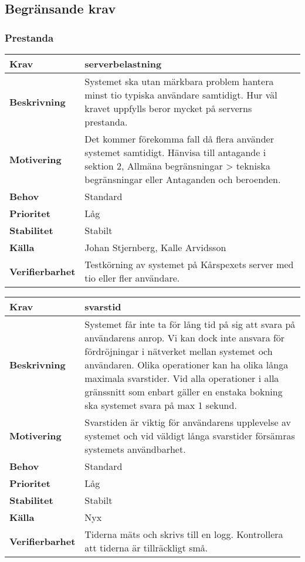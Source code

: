 \documentclass[a4paper, twoside, 11pt, titlepage]{article}
\begin{document}
	\subsection{Begränsande krav}



		\subsubsection{Prestanda}


		\begin{tabular} { p{2.6cm} p{12.5cm} }
			\hline
			\sffamily\textbf{Krav} & serverbelastning  \\
			\hline
			\sffamily\textbf{Beskrivning} & Systemet ska utan märkbara problem hantera minst tio typiska användare samtidigt. Hur väl kravet uppfylls beror mycket på serverns prestanda.  \\
			\hline
			\sffamily\textbf{Motivering} & Det kommer förekomma fall då flera använder systemet samtidigt. Hänvisa till antagande i sektion 2, Allmäna begränsningar > tekniska begränsningar eller Antaganden och beroenden.  \\
			\hline
			\sffamily\textbf{Behov} & Standard  \\
			\hline
			\sffamily\textbf{Prioritet} & Låg  \\
			\hline
			\sffamily\textbf{Stabilitet} & Stabilt  \\
			\hline
			\sffamily\textbf{Källa} & Johan Stjernberg, Kalle Arvidsson  \\
			\hline
			\sffamily\textbf{Verifierbarhet} & Testkörning av systemet på Kårspexets server med tio eller fler användare.  \\
			\hline
		\end{tabular}
		\vspace{6mm}

		\begin{tabular} { p{2.6cm} p{12.5cm} }
			\hline
			\sffamily\textbf{Krav} & svarstid  \\
			\hline
			\sffamily\textbf{Beskrivning} & Systemet får inte ta för lång tid på sig att svara på användarens anrop. Vi kan dock inte ansvara för fördröjningar i nätverket mellan systemet och användaren. Olika operationer kan ha olika långa maximala svarstider. Vid alla operationer i alla gränssnitt som enbart gäller en enstaka bokning ska systemet svara på max 1 sekund.  \\
			\hline
			\sffamily\textbf{Motivering} & Svarstiden är viktig för användarens upplevelse av systemet och vid väldigt långa svarstider försämras systemets användbarhet.  \\
			\hline
			\sffamily\textbf{Behov} & Standard  \\
			\hline
			\sffamily\textbf{Prioritet} & Låg  \\
			\hline
			\sffamily\textbf{Stabilitet} & Stabilt  \\
			\hline
			\sffamily\textbf{Källa} & Nyx  \\
			\hline
			\sffamily\textbf{Verifierbarhet} & Tiderna mäts och skrivs till en logg. Kontrollera att tiderna är tillräckligt små.  \\
			\hline
		\end{tabular}
\end{document}
